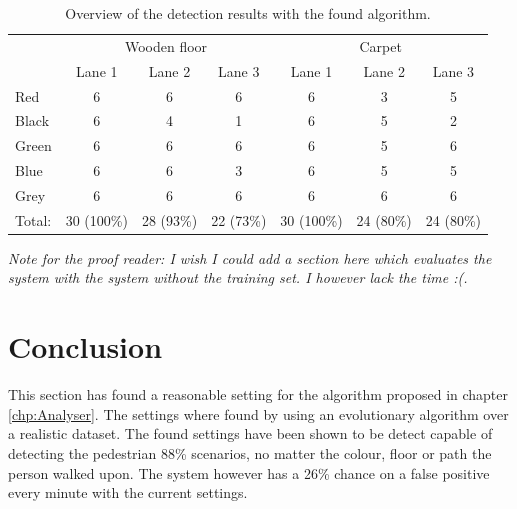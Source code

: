 \begin{table}[]
	\centering
	\begin{tabular}{l|ccc|ccc}
		& \multicolumn{3}{c|}{Wooden floor}  & \multicolumn{3}{c|}{Carpet}        \\
		& Lane 1     & Lane 2    & Lane 3    & Lane 1     & Lane 2    & Lane 3    \\ \hline
		Red    & 6          & 6         & 6         & 6          & 3         & 5         \\
		Black  & 6          & 4         & 1         & 6          & 5         & 2         \\
		Green  & 6          & 6         & 6         & 6          & 5         & 6         \\
		Blue   & 6          & 6         & 3         & 6          & 5         & 5         \\
		Grey   & 6          & 6         & 6         & 6          & 6         & 6         \\ \hline
		Total: & 30 (100\%) & 28 (93\%) & 22 (73\%) & 30 (100\%) & 24 (80\%) & 24 (80\%)
	\end{tabular}
	\caption{Overview of the detection results with the found algorithm.\label{tbl:algresults}}
\end{table}
\emph{\color{red} Note for the proof reader: I wish I could add a section here which evaluates the system with the system without the training set. I however lack the time :(.} 
\\
\section{Conclusion}
This section has found a reasonable setting for the algorithm proposed in chapter \ref{chp:Analyser}. The settings where found by using an evolutionary algorithm over a realistic dataset. The found settings have been shown to be detect capable of detecting the pedestrian 88\% scenarios, no matter the colour, floor or path the person walked upon. The system however has a 26\% chance on a false positive every minute with the current settings.